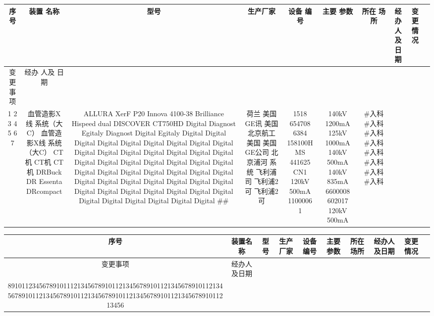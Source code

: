\begin{table}[H]
\centering
\begin{tabular}{|c|c|c|c|c|c|c|c|c|c|}
\hline
序号 & 装置 名称 & 型号 & 生产厂家 & 设备 编号 & 主要 参数 & 所在 场所 & 经办 人及 日期 & 变更情况 &  \\
\hline
变更 事项 & 经办 人及 日期 &  &  &  &  &  &  &  &  \\
\hline
1 2 3 4 5 6 7 & 血管造影X线 系统（大C） 血管造影X线 系统（大C） CT机 CT机 CT机 DRBuck DR Essenta DRcompact & ALLURA XerF P20 Innova 4100-38 Brilliance Hispeed dual DISCOVER CT750HD Digital Diagnost Egitaly Diagnost Digital Egitaly Digital Digital Digital Digital Digital Digital Digital Digital Digital Digital Digital Digital Digital Digital Digital Digital Digital Digital Digital Digital Digital Digital Digital Digital Digital Digital Digital Digital Digital Digital Digital Digital Digital Digital Digital Digital Digital Digital Digital Digital Digital Digital Digital Digital Digital Digital Digital Digital Digital Digital \#\# & 荷兰 美国GE讯 美国 北京航工 美国 美国GE公司 北京浦河 系统 飞利浦司 飞利浦2可 飞利浦2可 & 1518 654708 6384 158100HMS 441625 CN1 120kV 500mA 11000061 & 140kV 1200mA 125kV 1000mA 140kV 500mA 140kV 835mA 6600008 602017 120kV 500mA & \#入科 \#入科 \#入科 \#入科 \#入科 \#入科 \#入科 \#入科 &  &  &  \\
\hline
\end{tabular}
\end{table}


\begin{table}[H]
\centering
\begin{tabular}{|c|c|c|c|c|c|c|c|c|c|}
\hline
序号 & 装置名称 & 型号 & 生产厂家 & 设备编号 & 主要参数 & 所在场所 & 经办人及日期 & 变更情况 &  \\
\hline
变更事项 & 经办人及日期 &  &  &  &  &  &  &  &  \\
\hline
891011234567891011121345678910112134567891011213456789101121345678910112134567891011213456789101121345678910112134567891011213456 &  &  &  &  &  &  &  &  &  \\
\hline
\end{tabular}
\end{table}



